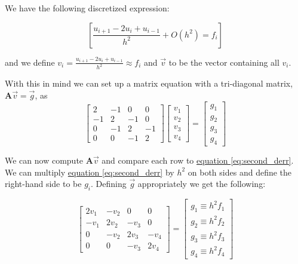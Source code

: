\documentclass[english,notitlepage]{article}  %
\begin{document}
    We have the following discretized expression:

    \begin{equation}\label{eq:second_derr}
        \left[\frac{u_{i+1} - 2u_i + u_{i-1}}{h^2} + O(h^2) = f_i\right]
    \end{equation}

    and we define $v_i = \frac{u_{i+1} - 2u_i + u_{i-1}}{h^2} \approx f_i$ and $\vec{v}$ to be the vector containing all $v_i$.

    With this in mind we can set up a matrix equation with a tri-diagonal matrix, $\boldsymbol{A}\vec{v} = \vec{g}$, as
    \begin{equation}\label{eq:mat_Avg}
        \begin{bmatrix}
            2 & -1 & 0 & 0 \\
            -1 & 2 & -1 & 0 \\
            0 & -1 & 2 & -1 \\
            0 & 0 & -1 & 2
        \end{bmatrix} \begin{bmatrix}
            v_1\\
            v_2\\
            v_3\\
            v_4
        \end{bmatrix} = \begin{bmatrix}
            g_1\\
            g_2\\
            g_3\\
            g_4
        \end{bmatrix}
    \end{equation}

    We can now compute $\boldsymbol{A}\vec{v}$ and compare each row to \hyperref[eq:second_derr]{equation \ref*{eq:second_derr}}. We can multiply \hyperref[eq:second_derr]{equation \ref*{eq:second_derr}} by $h^2$ on both sides and define the right-hand side to be $g_i$. Defining $\vec{g}$ appropriately we get the following:

    \begin{equation}\label{eq:mat_Vhf}
        \begin{bmatrix}
            2v_1 & -v_2 & 0 & 0 \\
            -v_1 & 2v_2 & -v_3 & 0 \\
            0 & -v_2 & 2v_3 & -v_4 \\
            0 & 0 & -v_3 & 2v_4
        \end{bmatrix} = \begin{bmatrix}
            g_1 \equiv h^2 f_1\\
            g_2 \equiv h^2 f_2\\
            g_3 \equiv h^2 f_3\\
            g_4 \equiv h^2 f_4
        \end{bmatrix}
    \end{equation}
\end{document}
